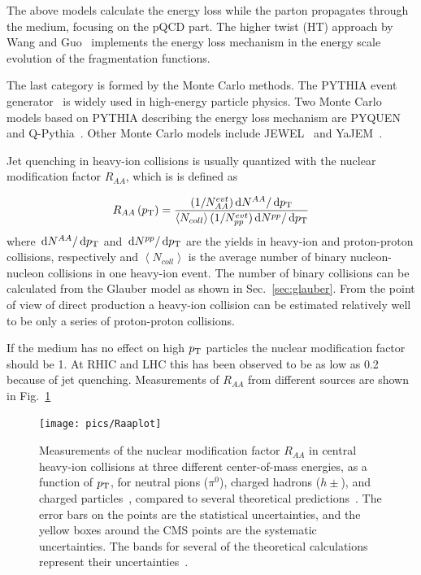 The above models calculate the energy loss while the parton propagates through the medium, focusing on the pQCD part. The higher twist (HT) approach by Wang and Guo~\cite{Wang:2001ifa} implements the energy loss mechanism in the energy scale evolution of the fragmentation functions.

The last category is formed by the Monte Carlo methods. The PYTHIA event generator~\cite{pythia} is widely used in high-energy particle physics. Two Monte Carlo models based on PYTHIA describing the energy loss mechanism are PYQUEN~\cite{Lokhtin:2005px} and Q-Pythia~\cite{Armesto:2009zc}. Other Monte Carlo models include JEWEL~\cite{Zapp:2008gi} and YaJEM~\cite{Renk:2009nz}.

Jet quenching in heavy-ion collisions is usually quantized with the nuclear modification factor $R_{AA}$, which is  is defined as

\begin{equation}
R_{AA}\left(p_{\rm T}\right) = \frac{(1/N_{AA}^{evt})\,\textrm d{N^{AA}}/\,\textrm d{p_{\rm T}}}{\left< N_{coll}\right> (1/N_{pp}^{evt})\,\textrm d{N^{pp}}/\,\textrm d{p_{\rm T}}}\label{eq:raa}
\end{equation}
\noindent where $\,\textrm d{N^{AA}}/\,\textrm d{p_{\rm T}}$ and $\,\textrm d{N^{pp}}/\,\textrm d{p_{\rm T}}$ are the yields in heavy-ion and proton-proton collisions, respectively and $\left< N_{coll}\right>$ is the average number of binary nucleon-nucleon collisions in one heavy-ion event. The number of binary collisions can be calculated from the Glauber model as shown in Sec.~\ref{sec:glauber}. From the point of view of direct production a heavy-ion collision can be estimated relatively well to be only a series of proton-proton collisions. 

If the medium has no effect on high $p_{\rm T}$ particles the nuclear modification factor should be 1. At RHIC and LHC this has been observed to be as low as 0.2 because of jet quenching. Measurements of $R_{AA}$ from different sources are shown in Fig.~\ref{fig:Raa}

\begin{figure}[hbt]
	\centering
                \texttt{[image: pics/Raaplot]}
        \caption[Measurements of the nuclear modification factor $R_{AA}$ in central heavy-ion collisions]{Measurements of the nuclear modification factor $R_{AA}$ in central heavy-ion collisions at three different center-of-mass energies, as a function of $p_{\rm T}$, for neutral pions ($\pi^0$), charged hadrons ($h\pm$), and charged particles~\cite{Aamodt:2010jd, Aggarwal:2001gn, d'Enterria:2004ig, Adare:2008qa, Adams:2003kv}, compared to several theoretical predictions~\cite{Dainese:2004te, Vitev:2002pf, Vitev:2004bh, Salgado:2003gb, Armesto:2005iq, Renk:2011gj}. The error bars on the points are the statistical uncertainties, and the yellow boxes around the CMS points are the systematic uncertainties. The bands for several of the theoretical calculations represent their uncertainties~\cite{CMS:2012aa}.}
        \label{fig:Raa}
\end{figure}


